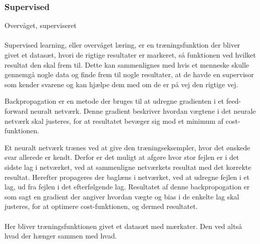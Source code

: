 \subsubsection*{Supervised}
Overvåget, superviseret
\\\\
Supervised learning, eller overvåget læring, er en træningsfunktion der bliver givet et datasæt, hvori de rigtige resultater er markeret, så funktionen ved hvilket resultat den skal frem til. Dette kan sammenlignes med hvis et menneske skulle gennemgå nogle data og finde frem til nogle resultater, at de havde en supervisor som kender svarene og kan hjælpe dem med om de er på vej den rigtige vej\citep{Jeanmonod2018}.
\par
Backpropagation er en metode der bruges til at udregne gradienten i et feed-forward neuralt netværk. Denne gradient beskriver hvordan vægtene i det neurale netværk skal justeres, for at resultatet bevæger sig mod et minimum af cost-funktionen. 
\par
Et neuralt netværk trænes ved at give den træningseksempler, hvor det ønskede svar allerede er kendt. Derfor er det muligt at afgøre hvor stor fejlen er i det sidste lag i netværket, ved at sammenligne netværkets resultat med det korrekte resultat. Herefter propageres der baglæns i netværket, ved at udregne fejlen i et lag, ud fra fejlen i det efterfølgende lag\cite{Nielsen2015}. Resultatet af denne backpropogation er som sagt en gradient der angiver hvordan vægte og bias i de enkelte lag skal justeres, for at optimere cost-funktionen, og dermed resultatet. 
\\\\
Her bliver træningsfunktionen givet et datasæt med mærkater. Den ved altså hvad der hænger sammen med hvad.
\\\\



